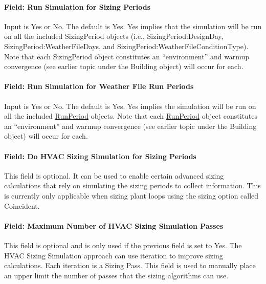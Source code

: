 \paragraph{Field: Run Simulation for Sizing Periods}\label{field-run-simulation-for-sizing-periods}

Input is Yes or No. The default is Yes. Yes implies that the simulation will be run on all the included SizingPeriod objects (i.e., Sizing\-Period:\-Design\-Day, Sizing\-Period:\-Weather\-File\-Days, and Sizing\-Period:\-Weather\-File\-Condition\-Type). Note that each Sizing\-Period object constitutes an ``environment'' and warmup convergence (see earlier topic under the Building object) will occur for each.

\paragraph{Field: Run Simulation for Weather File Run Periods}\label{field-run-simulation-for-weather-file-run-periods}

Input is Yes or No. The default is Yes. Yes implies the simulation will be run on all the included \hyperref[runperiod]{RunPeriod} objects. Note that each \hyperref[runperiod]{RunPeriod} object constitutes an ``environment'' and warmup convergence (see earlier topic under the Building object) will occur for each.

\paragraph{Field: Do HVAC Sizing Simulation for Sizing Periods}\label{field-do-hvac-sizing-simulation-for-sizing-periods}

This field is optional. It can be used to enable certain advanced sizing calculations that rely on simulating the sizing periods to collect information. This is currently only applicable when sizing plant loops using the sizing option called Coincident.

\paragraph{Field: Maximum Number of HVAC Sizing Simulation Passes}\label{field-maximum-number-of-hvac-sizing-simulation-passes}

This field is optional and is only used if the previous field is set to Yes. The HVAC Sizing Simulation approach can use iteration to improve sizing calculations. Each iteration is a Sizing Pass. This field is used to manually place an upper limit the number of passes that the sizing algorithms can use.

